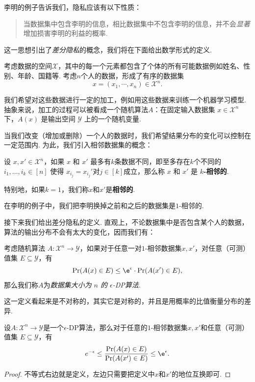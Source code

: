 李明的例子告诉我们，隐私应该有以下性质：
\begin{quotation}
    当数据集中包含李明的信息，相比数据集中不包含李明的信息，并不会\emph{显著}增加损害李明的利益的概率.
\end{quotation}
这一思想引出了\emph{差分隐私}的概念，我们将在下面给出数学形式的定义.

考虑数据的空间$\mathcal X$，其中的每一个元素都包含了个体的所有可能数据例如姓名、性别、年龄、国籍等. 考虑$n$个人的数据，形成了有序的数据集
\[x = (x_1, \cdots, x_n) \in \mathcal X^n.\]  

我们希望对这些数据进行一定的加工，例如用这些数据来训练一个机器学习模型. 抽象来说，加工的过程可以被看成一个随机算法$A$：在固定输入数据集 $x \in \mathcal X^n$下，$A(x)$ 是输出空间 $\mathcal Y$ 上的一个随机变量. 

当我们改变（增加或删除）一个人的数据时，我们希望结果分布的变化可以控制在一定范围内. 为此，我们引入相邻数据集的概念：

\begin{definition}[$k$-相邻数据集]
    设 $x, x' \in \mathcal X^n$，如果 $x$ 和 $x'$ 最多有$k$条数据不同，即至多存在$k$个不同的$i_1,\dots,i_k \in [n]$ 使得 $x_{i_j}=x_{i_j}'$对$j\in[k]$成立，那么称 $x$ 和 $x'$ 是 \textbf{$k$-相邻的}. 
    
    特别地，如果$k=1$，我们称$x$和$x'$是\textbf{相邻的}.
\end{definition}

在李明的例子中，我们把李明换掉之前和之后的数据集是$1$-相邻的. 

接下来我们给出差分隐私的定义. 直观上，不论数据集中是否包含某个人的数据，算法的输出分布不会有太大的变化，因而我们有：

\begin{definition}
考虑随机算法 $A : \mathcal X^n \to \mathcal Y$，如果对于任意一对$1$-相邻数据集$x, x'$，对任意（可测）值集 $E \subseteq \mathcal Y$，有
\[
\Pr(A(x)\in E) \leq \e^{\epsilon} \cdot \Pr(A(x')\in E),
\]
那么我们称$A$为\emph{数据集大小为 $n$ 的 $\epsilon$-DP算法}.
\end{definition}

这一定义看起来是不对称的，其实它是对称的，并且是用概率的比值衡量分布的差异. 

\begin{proposition}
    设$A:\mathcal X^n\to\mathcal Y$是一个$\epsilon$-DP算法，那么对于任意的$1$-相邻数据集$x, x'$和任意（可测）值集 $E \subseteq \mathcal Y$，有
    \[
    e^{-\epsilon}\leq \frac{\Pr(A(x)\in E)}{\Pr(A(x')\in E)}\leq \e^{\epsilon}.
    \]
\end{proposition}
\begin{proof}
    不等式右边就是定义，左边只需要把定义中$x$和$x'$的地位互换即可.
\end{proof}

